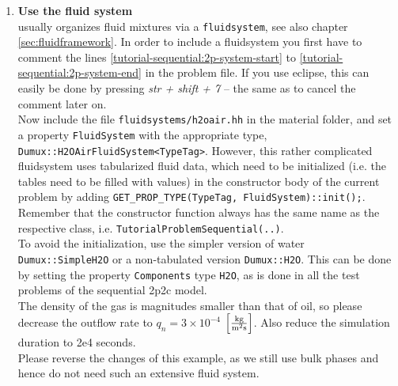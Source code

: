 \begin{enumerate}
\item \textbf{Use the \Dumux fluid system}\label{dec-ex1-fluidsystem} \\
\Dumux usually organizes fluid mixtures via a \texttt{fluidsystem}, see also chapter
\ref{sec:fluidframework}. In order to include a fluidsystem you first have to comment
the lines \ref{tutorial-sequential:2p-system-start} to \ref{tutorial-sequential:2p-system-end}
in the problem file. If you use eclipse, this can easily be done by pressing
\textit{str + shift + 7} -- the same as to cancel the comment later on.\\
Now include the file \texttt{fluidsystems/h2oair.hh} in the material folder,
and set a property \texttt{FluidSystem} with the appropriate type,
\texttt{Dumux::H2OAirFluidSystem<TypeTag>}. However, this rather complicated fluidsystem
uses tabularized fluid data, which need to be initialized (i.e. the tables need to be
filled with values) in the constructor body of the current problem by adding
\texttt{GET\_PROP\_TYPE(TypeTag, FluidSystem)::init();}. Remember that the constructor
function always has the same name as the respective class, i.e. \texttt{TutorialProblemSequential(..)}.\\
To avoid the initialization, use the simpler version of water \texttt{Dumux::SimpleH2O}
or a non-tabulated version \texttt{Dumux::H2O}. This can be done by setting the property
\texttt{Components} type \texttt{H2O},
as is done in all the test problems of the sequential 2p2c model.\\
The density of the gas is magnitudes smaller than that of oil, so please decrease
the outflow rate to $q_n = 3 \times 10^{-4}$ $\left[\frac{\textnormal{kg}}{\textnormal{m}^2 \textnormal{s}}\right]$.
Also reduce the simulation duration to 2e4 seconds.\\
Please reverse the changes of this example, as we still use bulk phases and
hence do not need such an extensive fluid system.


\end{enumerate}
